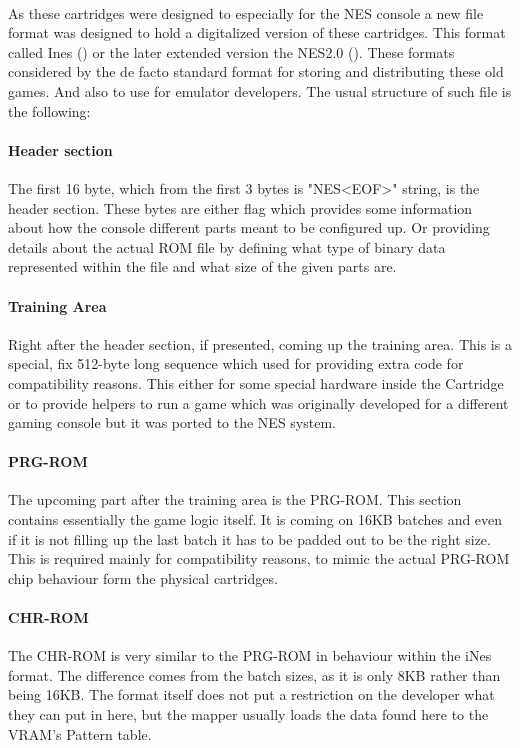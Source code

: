 \documentclass[]{report}
\begin{document}
\paragraph{ }
As these cartridges were designed to especially for the NES console a new file format was designed to hold a digitalized version of these cartridges. This format called Ines (\cite{INES}) or the later extended version the NES2.0 (\cite{INS2}). These formats considered by the de facto standard format for storing and distributing these old games. And also to use for emulator developers.
The usual structure of such file is the following:

\paragraph{Header section}
The first 16 byte, which from the first 3 bytes is "NES<EOF>" string, is the header section. These bytes are either flag which provides some information about how the console different parts meant to be configured up. Or providing details about the actual ROM file by defining what type of binary data represented within the file and what size of the given parts are.

\paragraph{Training Area}
Right after the header section, if presented, coming up the training area. This is a special, fix 512-byte long sequence which used for providing extra code for compatibility reasons. This either for some special hardware inside the Cartridge or to provide helpers to run a game which was originally developed for a different gaming console but it was ported to the NES system.

\paragraph{PRG-ROM}
The upcoming part after the training area is the PRG-ROM. This section contains essentially the game logic itself. It is coming on 16KB batches and even if it is not filling up the last batch it has to be padded out to be the right size. This is required mainly for compatibility reasons, to mimic the actual PRG-ROM chip behaviour form the physical cartridges.

\paragraph{CHR-ROM}
The CHR-ROM is very similar to the PRG-ROM in behaviour within the iNes format. The difference comes from the batch sizes, as it is only 8KB rather than being 16KB. The format itself does not put a restriction on the developer what they can put in here, but the mapper usually loads the data found here to the VRAM's Pattern table.
\end{document}
